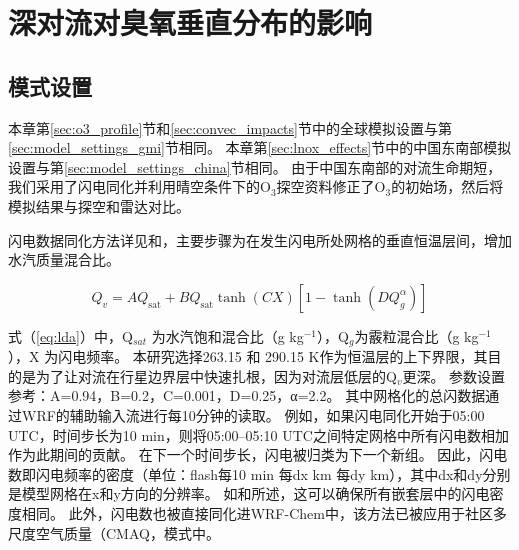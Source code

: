 
\chapter{深对流对臭氧垂直分布的影响}

\section{模式设置}



本章第\ref{sec:o3_profile}节和\ref{sec:convec_impacts}节中的全球模拟设置与第\ref{sec:model_settings_gmi}节相同。
本章第\ref{sec:lnox_effects}节中的中国东南部模拟设置与第\ref{sec:model_settings_china}节相同。
由于中国东南部的对流生命期短，我们采用了闪电同化并利用晴空条件下的O$_3$探空资料修正了O$_3$的初始场，然后将模拟结果与探空和雷达对比。

闪电数据同化方法详见\citet{Fierro.2012}和\citet{Li.2017b}，主要步骤为在发生闪电所处网格的垂直恒温层间，增加水汽质量混合比。

\begin{equation} \label{eq:lda}
Q_{v}=A Q_{\mathrm{sat}}+B Q_{\mathrm{sat}} \tanh (C X)\left[1-\tanh \left(D Q_{g}^{\alpha}\right)\right]
\end{equation}

式（\ref{eq:lda}）中，Q$_{sat}$ 为水汽饱和混合比（g kg$^{−1}$），Q$_g$为霰粒混合比（g kg$^{−1}$），X 为闪电频率。
本研究选择263.15 和 290.15 K作为恒温层的上下界限，其目的是为了让对流在行星边界层中快速扎根，因为对流层低层的Q$_v$更深\citep{Marchand.2014,Finney.2016,Li.2017b}。
参数设置参考\citet{Li.2017b}：A=0.94，B=0.2，C=0.001，D=0.25，α=2.2。
其中网格化的总闪数据通过WRF的辅助输入流进行每10分钟的读取。
例如，如果闪电同化开始于05:00 UTC，时间步长为10 min，则将05:00--05:10 UTC之间特定网格中所有闪电数相加作为此期间的贡献。
在下一个时间步长，闪电被归类为下一个新组。
因此，闪电数即闪电频率的密度（单位：flash每10 min 每dx km 每dy km），其中dx和dy分别是模型网格在x和y方向的分辨率。
如\citet{Fierro.2012}和\citet{Li.2017b}所述，这可以确保所有嵌套层中的闪电密度相同。
此外，闪电数也被直接同化进WRF-Chem中，该方法已被应用于社区多尺度空气质量（CMAQ，\citet{Kang.2019,Kang.2019a,Kang.2020}模式中。

